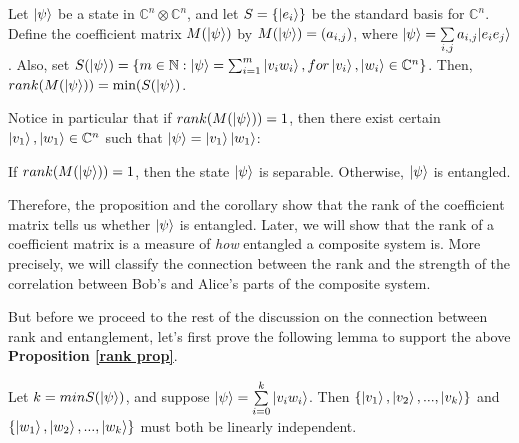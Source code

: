 \begin{prop}
\label{rank prop}
Let $\ket{\psi}$ be a state in $\mathbb{C}^n \otimes \mathbb{C}^n$, and let $S=\{\ket{e_i}\}$ be the standard basis for $\mathbb{C}^n$. Define the coefficient matrix $M(\ket{\psi})$ by $M(\ket{\psi})=(a_{i,j})$, where $\ket{\psi}=\sum\limits_{i,j}a_{i,j}|e_i e_j\rangle$.  Also, set $S(\ket{\psi})=\{m\in \mathbb{N}: \ket{\psi}=\sum_{i=1}^m\ket{v_i w_i}, for \ket{v_i}, \ket{w_i} \in \mathbb{C}^n\}$.  Then, $rank(M(\ket{\psi}))=\textrm{min} (S(\ket{\psi})$.
\end{prop}

Notice in particular that if $rank(M(\ket{\psi}))=1$, then there exist certain $\ket{v_1}, \ket{w_1} \in \mathbb{C}^n$ such that $\ket{\psi}=\ket{v_1}\ket{w_1}$:
\begin{corollary}
If $rank(M(\ket{\psi}))=1$, then the state $\ket{\psi}$ is separable. Otherwise, $\ket{\psi}$ is entangled.
\end{corollary}

Therefore, the proposition and the corollary show that the rank of the coefficient matrix tells us whether $\ket{\psi}$ is entangled. Later, we will show that the rank of a coefficient matrix is a measure of {\emph{how}} entangled a composite system is. More precisely, we will classify the connection between the rank and the strength of the correlation between Bob's and Alice's parts of the composite system.

But before we proceed to the rest of the discussion on the connection between rank and entanglement, let's first prove the following lemma to support the above \textbf{Proposition \ref{rank prop}}.

\begin{lemma}
\label{independence lemma}
Let $k=min S(\ket{\psi})$, and suppose $\ket{\psi}=\sum\limits_{i=0}^k \ket{v_iw_i}$.  Then $\{\ket{v_1}, \ket{v_2},...,\ket{v_k}\}$ and $\{\ket{w_1}, \ket{w_2},...,\ket{w_k}\}$ must both be linearly independent.
\end{lemma}

